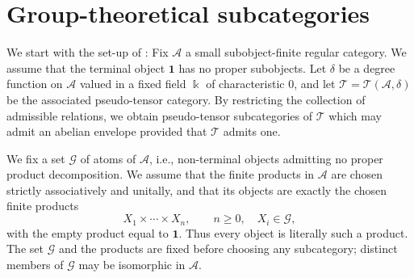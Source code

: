 \documentclass[11pt]{amsart}
\newcommand\Cref[1]{\zcref[S]{#1}}
\theoremstyle{definition}
\theoremstyle{remark}
\newcommand\cA{\mathcal A}
\newcommand\cT{\mathcal T}
\newcommand\kk{\Bbbk}
\renewcommand\:\colon
\newcommand\one{\mathbf{1}}
\newcommand\cG{\mathcal G}
\renewcommand\:\colon
\begin{document}
\section{Group-theoretical subcategories} \label{s:group-theoretical-subcats}

We start with the set-up of \Cref{bg:knop}:
Fix $\cA$ a small subobject-finite regular category. We assume that the terminal object $\one$ has no proper subobjects. Let $\delta$ be a degree function on $\cA$ valued in a fixed field $\kk$ of characteristic $0$, and let $\cT = \cT(\cA, \delta)$ be
the associated pseudo-tensor category. By restricting the collection of admissible relations, we obtain pseudo-tensor subcategories of $\cT$ which may admit an abelian envelope provided that $\cT$ admits one.

We fix a set $\cG$ of atoms of $\cA$, i.e., non-terminal objects admitting no proper product decomposition. We assume that the finite products in $\cA$ are chosen strictly associatively and unitally, and that its objects are exactly the chosen finite products
\[
    X_1\times\cdots\times X_n, \qquad n\geq 0,\quad X_i\in\cG,
\]
with the empty product equal to $\one$. Thus every object is literally such a product. The set $\cG$ and the products are fixed before choosing any subcategory; distinct members of $\cG$ may be isomorphic in $\cA$.
\end{document}

